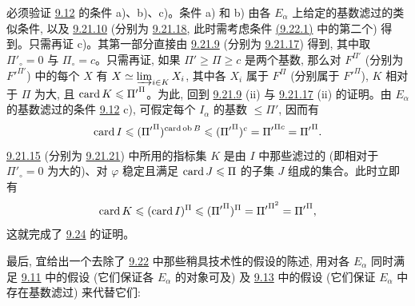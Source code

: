 必须验证 \hyperref[I.def9.12]{9.12} 的条件 a)、b)、c)。条件 a) 和 b) 由各 $E_\alpha$ 上给定的基数滤过的类似条件, 以及 \hyperref[I.lem9.21.10]{9.21.10} (分别为 \hyperref[I.lem9.21.18]{9.21.18}, 此时需考虑条件 \hyperlink{sga4.exp.I.equation.9.22.1}{(9.22.1)} 中的第二个) 得到。只需再证 c)。其第一部分直接由 \hyperref[I.lem9.21.9]{9.21.9} (分别为 \hyperref[I.lem9.21.17]{9.21.17}) 得到, 其中取 $\Pi'_\circ=0$ 与 $\Pi_\circ=c$。只需再证, 如果 $\Pi'\geq\Pi\geq c$ 是两个基数, 那么对 $F^{\Pi'}$ (分别为 ${F'}^{\Pi'}$) 中的每个 $X$ 有 $X\simeq\varinjlim_{i\in K}X_i$, 其中各 $X_i$ 属于 $F^{\Pi}$ (分别属于 ${F'}^{\Pi}$), $K$ 相对于 $\Pi$ 为大, 且 $\operatorname{card} K\leqslant{\Pi'}^{\Pi}$。为此, 回到 \hyperref[I.lem9.21.9]{9.21.9} (ii) 与 \hyperref[I.lem9.21.17]{9.21.17} (ii) 的证明。由 $E_\alpha$ 的基数滤过的条件 \hyperref[I.def9.12]{9.12} c), 可假定每个 $I_\alpha$ 的基数 $\leq\Pi'$, 因而有
$$
\operatorname{card} I\leqslant ({\Pi'}^{\Pi})^{\operatorname{card} \operatorname{ob} B}\leqslant
({\Pi'}^{\Pi})^c={\Pi'}^{\Pi c}={\Pi'}^{\Pi}{}.
$$
\hyperref[I.sec9.21.15]{9.21.15} (分别为 \hyperref[I.sec9.21.21]{9.21.21}) 中所用的指标集 $K$ 是由 $I$ 中那些滤过的 (即相对于 $\Pi'_\circ=0$ 为大的)、对 $\varphi$ 稳定且满足 $\operatorname{card} J\leqslant\Pi$ 的子集 $J$ 组成的集合。此时立即有
$$
\operatorname{card} K\leqslant (\operatorname{card} I)^{\Pi}\leqslant
({\Pi'}^{\Pi})^{\Pi}={\Pi'}^{\Pi^2}={\Pi'}^{\Pi}{},
$$
这就\pageoriginale 完成了 \hyperref[I.cor9.24]{9.24} 的证明。

最后, 宜给出一个去除了 \hyperref[I.them9.22]{9.22} 中那些稍具技术性的假设的陈述, 用对各 $E_\alpha$ 同时满足 \hyperref[I.prop9.11]{9.11} 中的假设 (它们保证各 $E_\alpha$ 的对象可及) 及 \hyperref[I.prop9.13]{9.13} 中的假设 (它们保证 $E_\alpha$ 中存在基数滤过) 来代替它们:


